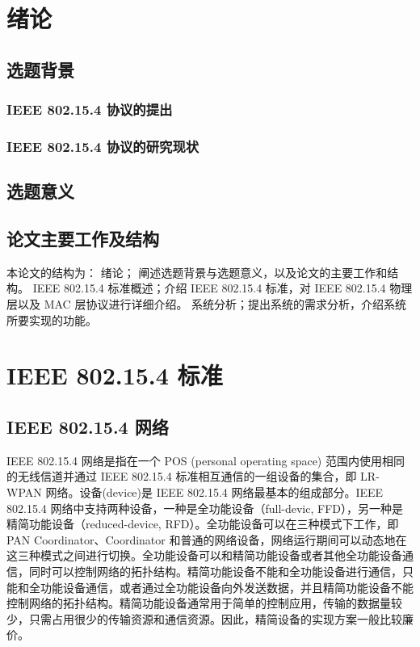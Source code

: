 \chapter{绪论}
\section{选题背景}
\subsection{IEEE 802.15.4 协议的提出}

\subsection{IEEE 802.15.4 协议的研究现状}

\section{选题意义}
\section{论文主要工作及结构}

本论文的结构为：
 {绪论； 阐述选题背景与选题意义，以及论文的主要工作和结构。}
 {IEEE 802.15.4 标准概述；介绍 IEEE 802.15.4 标准，对 IEEE 802.15.4 物理层以及 MAC 层协议进行详细介绍。}
 {系统分析；提出系统的需求分析，介绍系统所要实现的功能。}
\chapter{IEEE 802.15.4 标准}
\section{IEEE 802.15.4 网络}
IEEE 802.15.4 网络是指在一个 POS (personal operating space) 范围内使用相同的无线信道并通过 IEEE 802.15.4 标准相互通信的一组设备的集合，即 LR-WPAN 网络。设备(device)是 IEEE 802.15.4 网络最基本的组成部分。IEEE 802.15.4 网络中支持两种设备，一种是全功能设备（full-devic, FFD），另一种是精简功能设备（reduced-device, RFD）。全功能设备可以在三种模式下工作，即 PAN Coordinator、Coordinator 和普通的网络设备，网络运行期间可以动态地在这三种模式之间进行切换。全功能设备可以和精简功能设备或者其他全功能设备通信，同时可以控制网络的拓扑结构。精简功能设备不能和全功能设备进行通信，只能和全功能设备通信，或者通过全功能设备向外发送数据，并且精简功能设备不能控制网络的拓扑结构。精简功能设备通常用于简单的控制应用，传输的数据量较少，只需占用很少的传输资源和通信资源。因此，精简设备的实现方案一般比较廉价。


